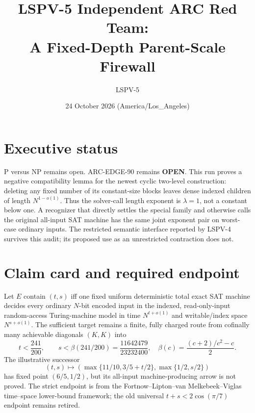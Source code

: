 \documentclass[11pt]{article}
\title{LSPV-5 Independent ARC Red Team:\\A Fixed-Depth Parent-Scale Firewall}
\author{LSPV-5}
\date{24 October 2026 (America/Los\_Angeles)}
\newcommand{\OPEN}{\textbf{OPEN}}
\begin{document}
\maketitle

\section*{Executive status}
P versus NP remains open.  ARC-EDGE-90 remains \OPEN.  This run proves a
negative compatibility lemma for the newest cyclic two-level construction:
deleting any fixed number of its constant-size blocks leaves dense indexed
children of length $N^{1-o(1)}$.  Thus the solver-call length exponent is
$\lambda=1$, not a constant below one.  A recognizer that directly settles the
special family and otherwise calls the original all-input SAT machine has the
same joint exponent pair on worst-case ordinary inputs.  The restricted
semantic interface reported by LSPV-4 survives this audit; its proposed use as
an unrestricted contraction does not.

\section*{Claim card and required endpoint}
Let $E$ contain $(t,s)$ iff one fixed uniform deterministic total exact SAT
machine decides every ordinary $N$-bit encoded input in the indexed,
read-only-input random-access Turing-machine model in time $N^{t+o(1)}$ and
writable/index space $N^{s+o(1)}$.  The sufficient target remains a finite,
fully charged route from cofinally many achievable diagonals $(K,K)$ into
\[
 t<\frac{241}{200},\qquad
 s<\beta(241/200)=\frac{11642479}{23232400},
 \quad
 \beta(c)=\frac{(c+2)/c^2-c}{2}.
\]
The illustrative successor
\[
 (t,s)\mapsto
 \left(\max\{11/10,3/5+t/2\},\max\{1/2,s/2\}\right)
\]
has fixed point $(6/5,1/2)$, but its all-input machine-producing arrow is not
proved.  The strict endpoint is from the Fortnow--Lipton--van Melkebeek--Viglas
time--space lower-bound framework; the old universal
$t+s<2\cos(\pi/7)$ endpoint remains retired.
\end{document}
